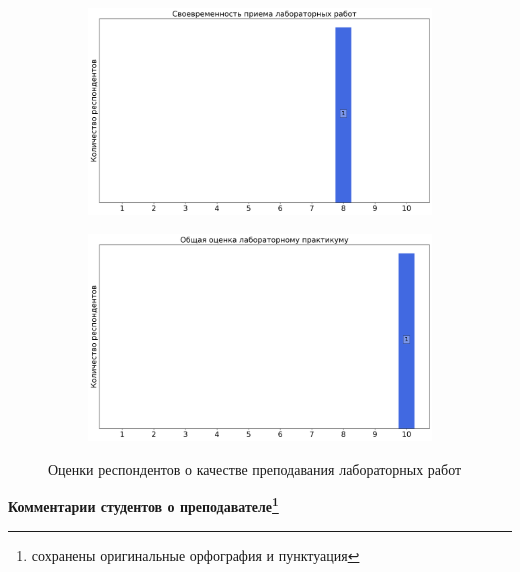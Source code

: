 \begin{figure}[H]
\begin{subfigure}[b]{0.45\textwidth}
				\includegraphics[width=\textwidth]{images/2 course/Общая физика - электричество и магнетизм/labniks-marks-Максимычев А.В.-2.png}
			\end{subfigure}
			\begin{subfigure}[b]{0.45\textwidth}
				\centering
				\includegraphics[width=\textwidth]{images/2 course/Общая физика - электричество и магнетизм/labniks-marks-Максимычев А.В.-3.png}
			\end{subfigure}	
			\caption{Оценки респондентов о качестве преподавания лабораторных работ}
		\end{figure}

		\textbf{Комментарии студентов о преподавателе\protect\footnote{сохранены оригинальные орфография и пунктуация}}


